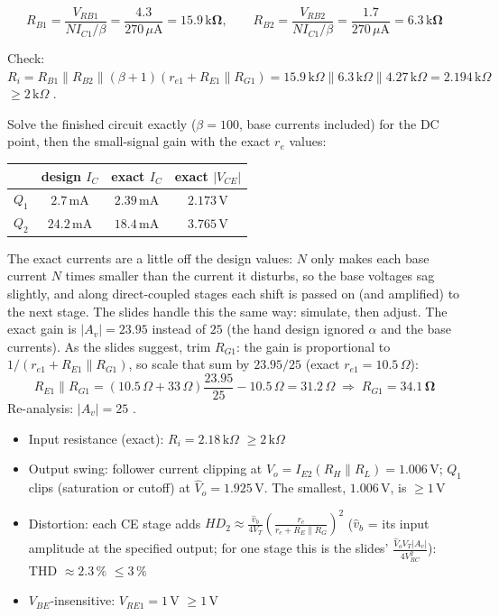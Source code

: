 \documentclass[11pt]{article}
\newcommand{\solstep}[2]{\par\medskip{\color{stepc}\textbf{Step #1 --- #2}}\par\nopagebreak}
\begin{document}
\[R_{B1} = \frac{V_{RB1}}{N I_{C1}/\beta} = \frac{4.3}{270\,\mu \mathrm{A}} = \mathbf{15.9\,\mathrm{k}\Omega},\qquad R_{B2} = \frac{V_{RB2}}{N I_{C1}/\beta} = \frac{1.7}{270\,\mu \mathrm{A}} = \mathbf{6.3\,\mathrm{k}\Omega}\]

Check: $R_i = R_{B1}\|R_{B2}\|(\beta+1)(r_{e1} + R_{E1}\|R_{G1}) = 15.9\,\mathrm{k}\Omega\|6.3\,\mathrm{k}\Omega\|4.27\,\mathrm{k}\Omega = 2.194\,\mathrm{k}\Omega$ $\ge 2\,\mathrm{k}\Omega$ \checkmark.
\solstep{4}{Check by analysis}Solve the finished circuit exactly ($\beta=100$, base currents included) for the DC point, then the small-signal gain with the exact $r_e$ values:\begin{center}\renewcommand{\arraystretch}{1.35}
\begin{tabular}{cccc}
\toprule
 & design $I_C$ & exact $I_C$ & exact $|V_{CE}|$ \\
\midrule
$Q_{1}$ & $2.7\,\mathrm{m}\mathrm{A}$ & $2.39\,\mathrm{m}\mathrm{A}$ & $2.173\,\mathrm{V}$ \\
$Q_{2}$ & $24.2\,\mathrm{m}\mathrm{A}$ & $18.4\,\mathrm{m}\mathrm{A}$ & $3.765\,\mathrm{V}$ \\
\bottomrule
\end{tabular}\end{center}
The exact currents are a little off the design values: $N$ only makes each base current $N$ times smaller than the current it disturbs, so the base voltages sag slightly, and along direct-coupled stages each shift is passed on (and amplified) to the next stage. The slides handle this the same way: simulate, then adjust. The exact gain is $|A_v| = 23.95$ instead of $25$ (the hand design ignored $\alpha$ and the base currents). As the slides suggest, trim $R_{G1}$: the gain is proportional to $1/(r_{e1} + R_{E1}\|R_{G1})$, so scale that sum by $23.95/25$ (exact $r_{e1} = 10.5\,\Omega$):\[R_{E1}\|R_{G1} = (10.5\,\Omega + 33\,\Omega)\frac{23.95}{25} - 10.5\,\Omega = 31.2\,\Omega \;\Rightarrow\; R_{G1} = \mathbf{34.1\,\Omega}\]Re-analysis: $|A_v| = 25$ \checkmark. \begin{itemize}[leftmargin=*,itemsep=2pt]
\item Input resistance (exact): $R_i = 2.18\,\mathrm{k}\Omega$ $\ge 2\,\mathrm{k}\Omega$ \checkmark
\item Output swing: follower current clipping at $\hat V_o = I_{E2}(R_H\|R_L) = 1.006\,\mathrm{V}$; $Q_{1}$ clips (saturation or cutoff) at $\hat V_o = 1.925\,\mathrm{V}$. The smallest, $1.006\,\mathrm{V}$, is $\ge 1$\,V \checkmark
\item Distortion: each CE stage adds $HD_2 \approx \frac{\hat v_b}{4V_T}\left(\frac{r_e}{r_e + R_E\|R_G}\right)^2$ ($\hat v_b$ = its input amplitude at the specified output; for one stage this is the slides' $\frac{\hat V_o V_T |A_v|}{4V_{RC}^2}$): THD $\approx 2.3\,\%$ $\le 3\,\%$ \checkmark
\item $V_{BE}$-insensitive: $V_{RE1} = 1$\,V $\ge 1$\,V \checkmark
\end{itemize}
\end{document}
